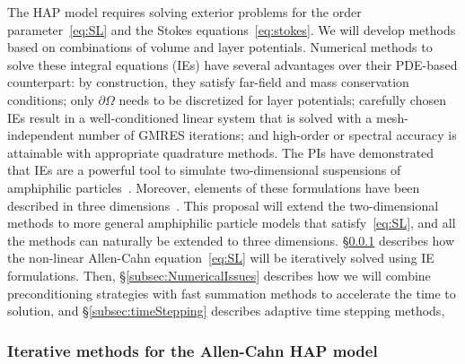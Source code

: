 The HAP model requires solving exterior problems for the order
parameter~\eqref{eq:SL} and the Stokes equations~\eqref{eq:stokes}. We
will develop methods based on combinations of volume and layer
potentials. Numerical methods to solve these integral equations (IEs)
have several advantages over their PDE-based counterpart: by
construction, they satisfy far-field and mass conservation conditions;
only $\partial\Omega$ needs to be discretized for layer potentials;
carefully chosen IEs result in a well-conditioned linear system that is
solved with a mesh-independent number of GMRES iterations; and
high-order or spectral accuracy is attainable with appropriate
quadrature methods. The PIs have demonstrated that IEs are a powerful
tool to simulate two-dimensional suspensions of amphiphilic
particles~\cite{Fu2018_SIAM, FuQuRyYo20}. Moreover, elements of these
formulations have been described in three dimensions~\cite{ying_2006,
manasthesis, rac-gre2016}. This proposal will extend the two-dimensional
methods to more general amphiphilic particle models that
satisfy~\eqref{eq:SL}, and all the methods can naturally be extended to
three dimensions. \S\ref{subsec:AC} describes how the non-linear
Allen-Cahn equation~\eqref{eq:SL} will be iteratively solved using IE
formulations. Then, \S\ref{subsec:NumericalIssues} describes how we will
combine preconditioning strategies with fast summation methods to
accelerate the time to solution, and \S\ref{subsec:timeStepping}
describes adaptive time stepping methods,

\subsubsection{Iterative methods for the Allen-Cahn HAP model}
\label{subsec:AC}

